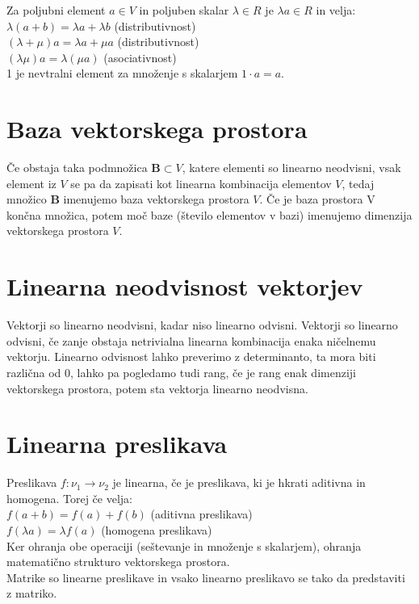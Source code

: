 \documentclass[12pt]{report}
\begin{document}
Za poljubni element $a\in V$ in poljuben skalar $\lambda \in R$ je $\lambda a \in R$ in velja:\\
$\lambda(a+b)=\lambda a+ \lambda b$ (distributivnost)\\
$(\lambda+ \mu)a=\lambda a+ \mu a$ (distributivnost)\\
$(\lambda\mu)a=\lambda(\mu a)$ (asociativnost)\\
1 je nevtralni element za množenje s skalarjem $1\cdot a=a$.


\section*{Baza vektorskega prostora}

Če obstaja taka podmnožica $\mathbf{B} \subset V$, katere elementi so linearno neodvisni, vsak element iz $V$ se pa da zapisati kot linearna kombinacija elementov $V$, tedaj množico $ \mathbf{B}$ imenujemo baza vektorskega prostora $V$. Če je baza prostora V končna množica, potem moč baze (število elementov v bazi) imenujemo dimenzija vektorskega prostora $V$.



\section*{Linearna neodvisnost vektorjev}

Vektorji so linearno neodvisni, kadar niso linearno odvisni. Vektorji so linearno odvisni, če zanje obstaja netrivialna linearna kombinacija enaka ničelnemu vektorju.
Linearno odvisnost lahko preverimo z determinanto, ta mora biti različna od 0, lahko pa pogledamo tudi rang, če je rang enak dimenziji vektorskega prostora, potem sta vektorja linearno neodvisna.

\section*{Linearna preslikava}

Preslikava $f:\nu_1 \rightarrow \nu_2$  je linearna, če je preslikava, ki je hkrati aditivna in homogena. Torej če velja:\\
$f(a+b) = f(a) + f(b)$ (aditivna preslikava) \\
$f(\lambda a) = \lambda f(a)$   (homogena preslikava)\\

Ker ohranja obe operaciji (seštevanje in množenje s skalarjem), ohranja matematično strukturo vektorskega prostora.\\
Matrike so linearne preslikave in vsako linearno preslikavo se tako da predstaviti z matriko.
\end{document}
